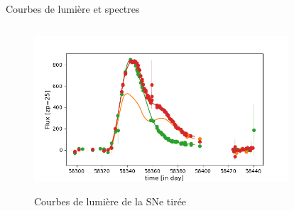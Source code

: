\documentclass{beamer}
\begin{document}
\begin{frame}{Courbes de lumière et spectres}
\begin{columns}
\begin{column}{.5\textwidth}
\begin{figure}
	\centering
	{\includegraphics[width=.9\textwidth]{figures/26_lc.png}}
	\caption{Courbes de lumière de la SNe tirée}
\end{figure}
\end{column}

\begin{column}{.5\textwidth}
\begin{figure}
	\centering
\end{figure}
\end{column}
\end{columns}	
\end{frame}
\end{document}
